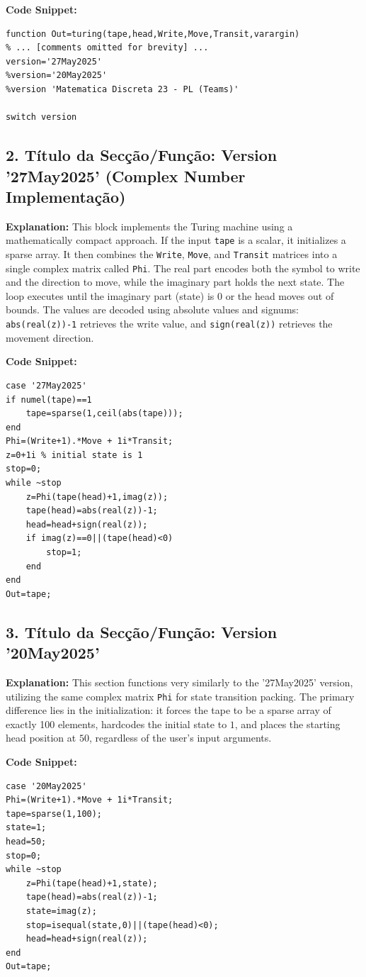 \textbf{Code Snippet:}
\begin{lstlisting}
function Out=turing(tape,head,Write,Move,Transit,varargin)
% ... [comments omitted for brevity] ...
version='27May2025'
%version='20May2025'
%version 'Matematica Discreta 23 - PL (Teams)'

switch version
\end{lstlisting}

\subsection*{2. Título da Secção/Função: Version '27May2025' (Complex Number Implementação)}
\textbf{Explanation:} This block implements the Turing machine using a mathematically compact approach. If the input \texttt{tape} is a scalar, it initializes a sparse array. It then combines the \texttt{Write}, \texttt{Move}, and \texttt{Transit} matrices into a single complex matrix called \texttt{Phi}. The real part encodes both the symbol to write and the direction to move, while the imaginary part holds the next state. The loop executes until the imaginary part (state) is $0$ or the head moves out of bounds. The values are decoded using absolute values and signums: \texttt{abs(real(z))-1} retrieves the write value, and \texttt{sign(real(z))} retrieves the movement direction.

\textbf{Code Snippet:}
\begin{lstlisting}
case '27May2025'
if numel(tape)==1
    tape=sparse(1,ceil(abs(tape)));
end
Phi=(Write+1).*Move + 1i*Transit;
z=0+1i % initial state is 1
stop=0;
while ~stop
    z=Phi(tape(head)+1,imag(z));
    tape(head)=abs(real(z))-1;
    head=head+sign(real(z));
    if imag(z)==0||(tape(head)<0)
        stop=1;
    end    
end
Out=tape;
\end{lstlisting}

\subsection*{3. Título da Secção/Função: Version '20May2025'}
\textbf{Explanation:} This section functions very similarly to the '27May2025' version, utilizing the same complex matrix \texttt{Phi} for state transition packing. The primary difference lies in the initialization: it forces the tape to be a sparse array of exactly 100 elements, hardcodes the initial state to $1$, and places the starting head position at $50$, regardless of the user's input arguments.

\textbf{Code Snippet:}
\begin{lstlisting}
case '20May2025'
Phi=(Write+1).*Move + 1i*Transit;
tape=sparse(1,100);
state=1;
head=50;
stop=0;
while ~stop
    z=Phi(tape(head)+1,state);
    tape(head)=abs(real(z))-1;
    state=imag(z);
    stop=isequal(state,0)||(tape(head)<0);
    head=head+sign(real(z));
end
Out=tape;
\end{lstlisting}

